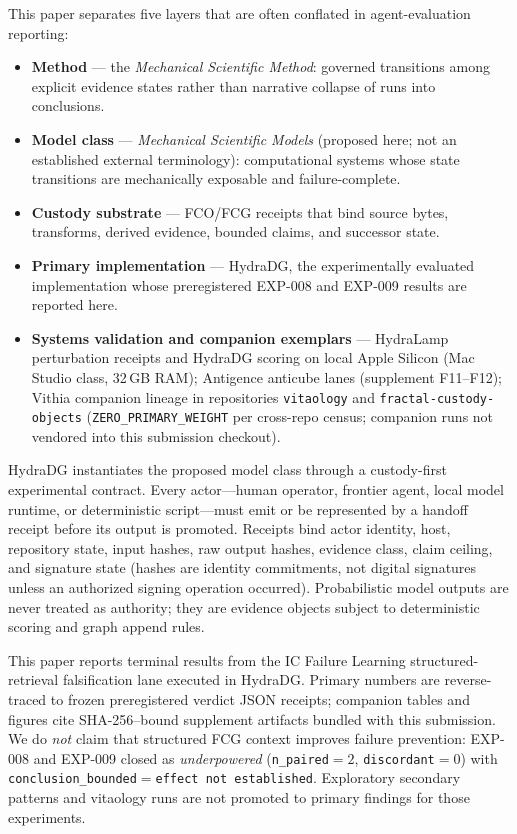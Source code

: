 \documentclass{article}
\begin{document}
This paper separates five layers that are often conflated in agent-evaluation reporting:
\begin{itemize}
  \item \textbf{Method} --- the \emph{Mechanical Scientific Method}: governed transitions among explicit evidence states rather than narrative collapse of runs into conclusions.
  \item \textbf{Model class} --- \emph{Mechanical Scientific Models} (proposed here; not an established external terminology): computational systems whose state transitions are mechanically exposable and failure-complete.
  \item \textbf{Custody substrate} --- FCO/FCG receipts that bind source bytes, transforms, derived evidence, bounded claims, and successor state.
  \item \textbf{Primary implementation} --- HydraDG, the experimentally evaluated implementation whose preregistered EXP-008 and EXP-009 results are reported here.
  \item \textbf{Systems validation and companion exemplars} --- HydraLamp perturbation receipts and HydraDG scoring on local Apple Silicon (Mac Studio class, 32\,GB RAM); Antigence anticube lanes (supplement F11--F12); Vithia companion lineage in repositories \texttt{vitaology} and \texttt{fractal-custody-objects} (\texttt{ZERO\_PRIMARY\_WEIGHT} per cross-repo census; companion runs not vendored into this submission checkout).
\end{itemize}

HydraDG instantiates the proposed model class through a custody-first experimental contract.
Every actor---human operator, frontier agent, local model runtime, or deterministic script---must emit or be represented by a handoff receipt before its output is promoted.
Receipts bind actor identity, host, repository state, input hashes, raw output hashes, evidence class, claim ceiling, and signature state (hashes are identity commitments, not digital signatures unless an authorized signing operation occurred).
Probabilistic model outputs are never treated as authority; they are evidence objects subject to deterministic scoring and graph append rules.

This paper reports terminal results from the IC Failure Learning structured-retrieval falsification lane executed in HydraDG.
Primary numbers are reverse-traced to frozen preregistered verdict JSON receipts; companion tables and figures cite SHA-256--bound supplement artifacts bundled with this submission.
We do \emph{not} claim that structured FCG context improves failure prevention: EXP-008 and EXP-009 closed as \emph{underpowered} (\texttt{n\_paired}$=2$, \texttt{discordant}$=0$) with \texttt{conclusion\_bounded}$=$\texttt{effect not established}.
Exploratory secondary patterns and vitaology runs are not promoted to primary findings for those experiments.
\end{document}
